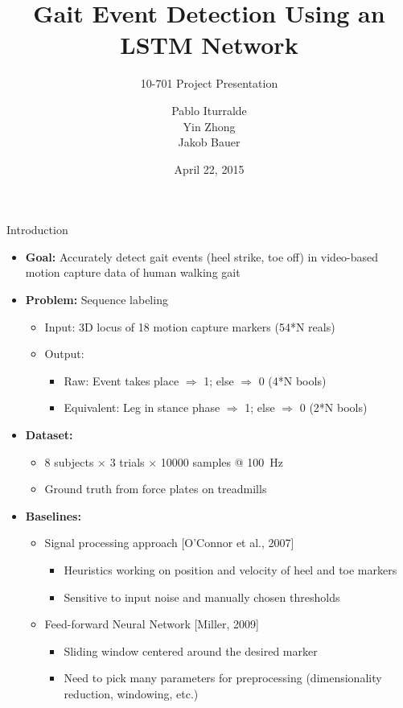 \documentclass{beamer}
\title
{
    Gait Event Detection Using an LSTM Network
}
\subtitle
{
    10-701
    Project Presentation
}
\author
{
    Pablo Iturralde\\
    Yin Zhong\\
    Jakob Bauer
}
\date
{
    April 22, 2015
}
\begin{document}
\begin{frame}
  \titlepage
\end{frame}

\begin{frame}{Introduction}
    \begin{itemize}
        \item \textbf{Goal:}
            Accurately detect gait events (heel strike, toe off) in video-based motion capture data of human walking gait
        \item \textbf{Problem:} Sequence labeling
        \begin{itemize}
            \item Input: 3D locus of 18 motion capture markers (54*N reals)
            \item Output:
            \begin{itemize}
                \item Raw: Event takes place $\Rightarrow$ 1; else $\Rightarrow$ 0 (4*N bools)
                \item Equivalent: Leg in stance phase $\Rightarrow$ 1; else $\Rightarrow$ 0 (2*N bools)
            \end{itemize}
        \end{itemize}
        \item \textbf{Dataset:}
        \begin{itemize}
            \item 8 subjects $\times$ 3 trials $\times$ \num{10000} samples @ \SI{100}{\Hz}
            \item Ground truth from force plates on treadmills
        \end{itemize}
        \item \textbf{Baselines:}
        \begin{itemize}
            \item Signal processing approach [O'Connor et al., 2007]
            \begin{itemize}
                \item Heuristics working on position and velocity of heel and toe markers
                \item Sensitive to input noise and manually chosen thresholds
            \end{itemize}
            \item Feed-forward Neural Network [Miller, 2009]
            \begin{itemize}
                \item Sliding window centered around the desired marker
                \item Need to pick many parameters for preprocessing (dimensionality reduction, windowing, etc.)
            \end{itemize}
        \end{itemize}
    \end{itemize}
\end{frame}
\end{document}
